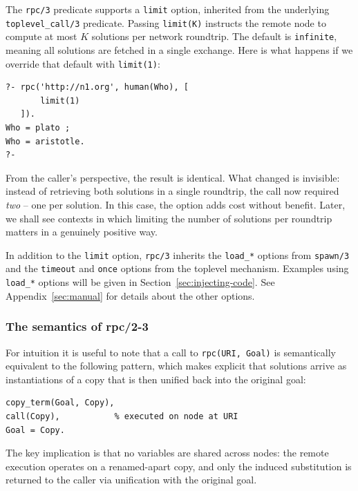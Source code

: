 The \texttt{rpc/3} predicate supports a \texttt{limit} option, inherited from
the underlying \texttt{toplevel\_call/3} predicate. Passing \texttt{limit(K)}
instructs the remote node to compute at most $K$ solutions per network roundtrip.
The default is \texttt{infinite}, meaning all solutions are fetched in a single
exchange. Here is what happens if we override that default with \texttt{limit(1)}:
\begin{verbatim}
?- rpc('http://n1.org', human(Who), [
       limit(1)
   ]).
Who = plato ;
Who = aristotle.
?-
\end{verbatim}
\noindent From the caller's perspective, the result is identical. What changed is
invisible: instead of retrieving both solutions in a single roundtrip, the call
now required \emph{two} -- one per solution. In this case, the option adds cost
without benefit. Later, we shall see contexts in which limiting the number of
solutions per roundtrip matters in a genuinely positive way.

\medskip
\noindent In addition to the \texttt{limit} option, \texttt{rpc/3} inherits the \texttt{load\_*} options from \texttt{spawn/3} and the \texttt{timeout} and \texttt{once} options from the toplevel mechanism. Examples using \texttt{load\_*} options will be given in Section~\ref{sec:injecting-code}. See Appendix~\ref{sec:manual} for details about the other options.


\subsubsection{The semantics of rpc/2-3}\label{sec:semantics-rpc}

For intuition it is useful to note that a call to
\texttt{rpc(URI,\,Goal)} is semantically equivalent to the following
pattern, which makes explicit that solutions arrive as instantiations
of a copy that is then unified back into the original goal:

\begin{verbatim}
copy_term(Goal, Copy),
call(Copy),           % executed on node at URI
Goal = Copy.
\end{verbatim}

\noindent The key implication is that no variables are shared across
nodes: the remote execution operates on a renamed-apart copy, and
only the induced substitution is returned to the caller via
unification with the original goal.

